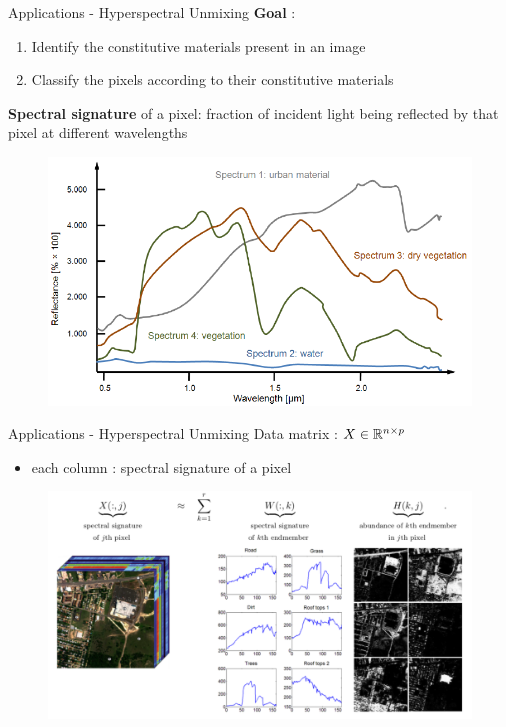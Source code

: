 \begin{frame}{Applications - Hyperspectral Unmixing}
    \textbf{Goal} :
    \begin{enumerate}
        \item Identify the constitutive materials present in an image
        \item Classify the pixels according to their constitutive materials
    \end{enumerate}
    \vspace{1cm}
    \textbf{Spectral signature} of a pixel: fraction of incident light being reflected by that pixel at different wavelengths\\
    \begin{figure}
        \centering
        \includegraphics[width=0.55\linewidth]{../images/Spectral-signatures.png}
    \end{figure}
\end{frame}

\begin{frame}{Applications - Hyperspectral Unmixing}
    Data matrix : $X\in\mathbb{R}^{n\times p}$\\
    \begin{itemize}
        \item each column : spectral signature of a pixel
    \end{itemize}
    \begin{figure}
        \centering
        \includegraphics[width=0.85\linewidth]{../images/NMF_app3.png}
    \end{figure}
\end{frame}
